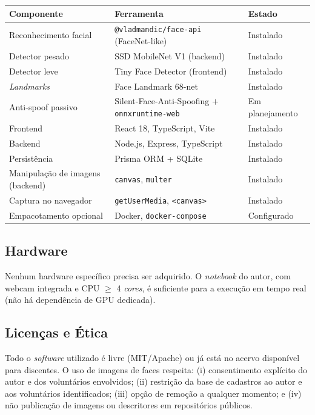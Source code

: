 \documentclass[12pt,a4paper]{article}
\begin{document}
\begin{center}
\begin{tabular}{llp{6cm}}
\toprule
\textbf{Componente} & \textbf{Ferramenta} & \textbf{Estado} \\
\midrule
Reconhecimento facial & \texttt{@vladmandic/face-api} (FaceNet-like) & Instalado \\
Detector pesado & SSD MobileNet V1 (backend) & Instalado \\
Detector leve & Tiny Face Detector (frontend) & Instalado \\
\emph{Landmarks} & Face Landmark 68-net & Instalado \\
Anti-spoof passivo & Silent-Face-Anti-Spoofing $+$ \texttt{onnxruntime-web} & Em planejamento \\
Frontend & React 18, TypeScript, Vite & Instalado \\
Backend & Node.js, Express, TypeScript & Instalado \\
Persist\^encia & Prisma ORM + SQLite & Instalado \\
Manipula\c{c}\~ao de imagens (backend) & \texttt{canvas}, \texttt{multer} & Instalado \\
Captura no navegador & \texttt{getUserMedia}, \texttt{<canvas>} & Instalado \\
Empacotamento opcional & Docker, \texttt{docker-compose} & Configurado \\
\bottomrule
\end{tabular}
\end{center}

\subsection{Hardware}

Nenhum hardware espec\'ifico precisa ser adquirido. O \emph{notebook} do autor,
com webcam integrada e CPU $\geq$ 4 \emph{cores}, \'e suficiente para a execu\c{c}\~ao em
tempo real (n\~ao h\'a depend\^encia de GPU dedicada).

\subsection{Licen\c{c}as e \'Etica}

Todo o \emph{software} utilizado \'e livre (MIT/Apache) ou j\'a est\'a no acervo dispon\'ivel
para discentes. O uso de imagens de faces respeita: (i) consentimento expl\'icito do autor e
dos volunt\'arios envolvidos; (ii) restri\c{c}\~ao da base de cadastros ao autor e aos
volunt\'arios identificados; (iii) op\c{c}\~ao de remo\c{c}\~ao a qualquer momento; e (iv)
n\~ao publica\c{c}\~ao de imagens ou descritores em reposit\'orios p\'ublicos.
\end{document}
